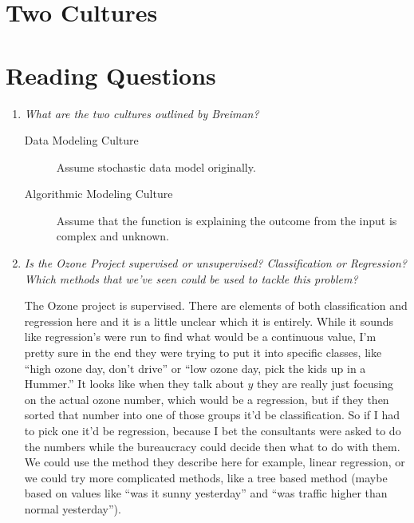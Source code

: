 \documentclass[10pt]{article}
\begin{document}
    
    
\bigskip

\section*{Two Cultures}

\section*{Reading Questions}

    \begin{enumerate}
    
    	\item \textit{What are the two cultures outlined by Breiman?}
	
		    \begin{description}
		    	\item[Data Modeling Culture] Assume stochastic data model originally. 
				\item[Algorithmic Modeling Culture] Assume that the function is explaining the outcome from the input is complex and unknown. 
			\end{description}
			
    	\item \textit{Is the Ozone Project supervised or unsupervised? Classification or Regression? Which methods that we've seen could be used to tackle this problem?}
	
			The Ozone project is supervised. There are elements of both classification and regression here and it is a little unclear which it is entirely. While it sounds like regression's were run to find what would be a continuous value, I'm pretty sure in the end they were trying to put it into specific classes, like ``high ozone day, don't drive'' or ``low ozone day, pick the kids up in a Hummer.'' It looks like when they talk about $y$ they are really just focusing on the actual ozone number, which would be a regression, but if they then sorted that number into one of those groups it'd be classification. So if I had to pick one it'd be regression, because I bet the consultants were asked to do the numbers while the bureaucracy could decide then what to do with them. We could use the method they describe here for example, linear regression, or we could try more complicated methods, like a tree based method (maybe based on values like ``was it sunny yesterday'' and ``was traffic higher than normal yesterday'').
			

\end{enumerate}
\end{document}
